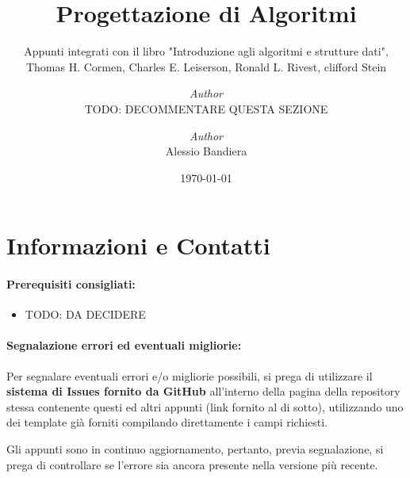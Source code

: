 \documentclass[a4paper, 12pt]{report}
\institute{\curlyquotes{\hspace{0.25mm}Sapienza} Università di Roma}
\title{Progettazione di Algoritmi}
\subtitle{Appunti integrati con il libro "Introduzione agli algoritmi e strutture dati", Thomas H. Cormen, Charles E. Leiserson, Ronald L. Rivest, clifford Stein}
\author{\textit{Author}\\TODO: DECOMMENTARE QUESTA SEZIONE}
\author{\textit{Author}\\Alessio Bandiera}
\date{\today}
\begin{document}
    \maketitle

    {
        \hypersetup{allcolors=black}

        \romantableofcontents
    }

    \chapter*{Informazioni e Contatti}      %
    
    \subsubsection{Prerequisiti consigliati:}
    \begin{itemize}
        \item TODO: DA DECIDERE
    \end{itemize}

    \quad

    \subsubsection{Segnalazione errori ed eventuali migliorie:}
    
    Per segnalare eventuali errori e/o migliorie possibili, si prega di utilizzare il \textbf{sistema di Issues fornito da GitHub} all'interno della pagina della repository stessa contenente questi ed altri appunti (link fornito al di sotto), utilizzando uno dei template già forniti compilando direttamente i campi richiesti.

    Gli appunti sono in continuo aggiornamento, pertanto, previa segnalazione, si prega di controllare se l'errore sia ancora presente nella versione più recente.
\end{document}
